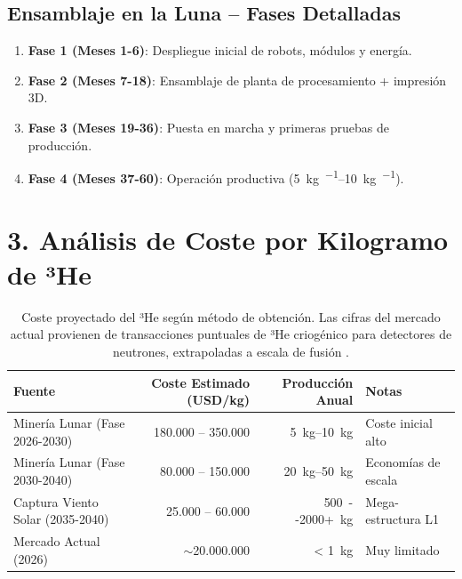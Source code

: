 \documentclass[11pt,a4paper]{article}
\begin{document}
\subsection{Ensamblaje en la Luna – Fases Detalladas}
\begin{enumerate}
\item \textbf{Fase 1 (Meses 1-6)}: Despliegue inicial de robots, módulos y energía.
\item \textbf{Fase 2 (Meses 7-18)}: Ensamblaje de planta de procesamiento + impresión 3D.
\item \textbf{Fase 3 (Meses 19-36)}: Puesta en marcha y primeras pruebas de producción.
\item \textbf{Fase 4 (Meses 37-60)}: Operación productiva (\SIrange{5}{10}{\kilo\gram\per\year}).
\end{enumerate}
\section{3. Análisis de Coste por Kilogramo de ³He}
\begin{table}[H]
\centering
\begin{tabular}{l r r l}
\toprule
\textbf{Fuente} & \textbf{Coste Estimado (USD/kg)} & \textbf{Producción Anual} & \textbf{Notas} \\
\midrule
Minería Lunar (Fase 2026-2030) & 180.000 -- 350.000 & \SIrange{5}{10}{\kilo\gram} & Coste inicial alto \\
Minería Lunar (Fase 2030-2040) & 80.000 -- 150.000 & \SIrange{20}{50}{\kilo\gram} & Economías de escala \\
Captura Viento Solar (2035-2040) & 25.000 -- 60.000 & \SI{500}{--}\SI{2000+}{\kilo\gram} & Mega-estructura L1 \\
Mercado Actual (2026) & \(\sim\)20.000.000 & < \SI{1}{\kilo\gram} & Muy limitado \\
\bottomrule
\end{tabular}
\caption{Coste proyectado del ³He según método de obtención. Las cifras del mercado actual provienen de transacciones puntuales de ³He criogénico para detectores de neutrones, extrapoladas a escala de fusión \cite{wittenberg1986}.}
\label{tab:coste}
\end{table}
\end{document}
